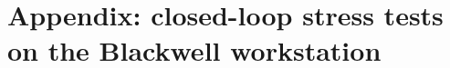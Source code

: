 \documentclass[10pt,a4paper]{article}
\newcommand{\ADRResultsPath}{..}
\begin{document}

\clearpage

  {\clearpage\section*{Appendix: closed-loop stress tests on the Blackwell workstation}
   }
  {}
\end{document}
